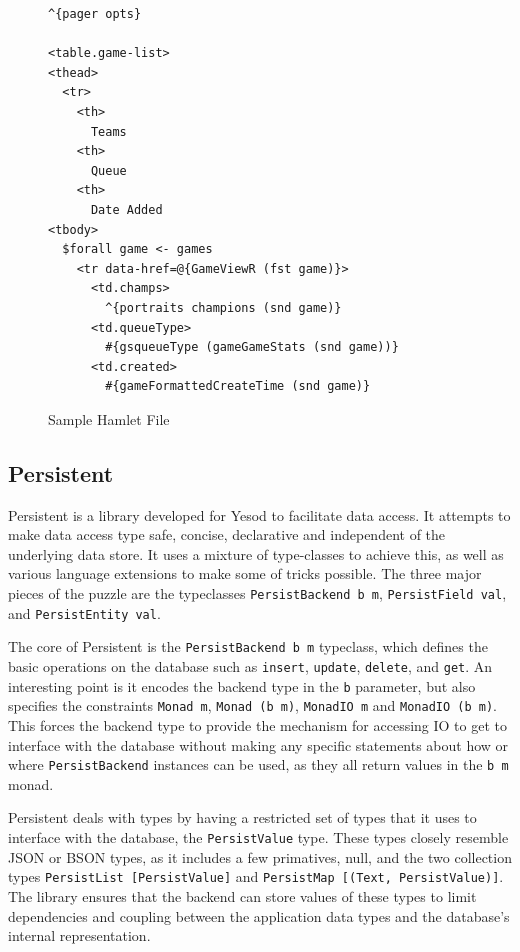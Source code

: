 \documentclass{chi2009}
\newcommand{\code}[1]{\texttt{#1}}
\begin{document}
\begin{figure}[]
\begin{verbatim}
^{pager opts}

<table.game-list>
<thead>
  <tr>
    <th>
      Teams
    <th>
      Queue
    <th>
      Date Added
<tbody>
  $forall game <- games
    <tr data-href=@{GameViewR (fst game)}>
      <td.champs>
        ^{portraits champions (snd game)}
      <td.queueType>
        #{gsqueueType (gameGameStats (snd game))}
      <td.created>
        #{gameFormattedCreateTime (snd game)}
\end{verbatim}
    \caption{Sample Hamlet File}
    \label{hamlet}
\end{figure}

\subsection{Persistent}

Persistent is a library developed for Yesod to facilitate data access.  It attempts to make data access type safe, concise, declarative and independent of the underlying data store.  It uses a mixture of type-classes to achieve this, as well as various language extensions to make some of tricks possible.  The three major pieces of the puzzle are the typeclasses \code{PersistBackend b m}, \code{PersistField val}, and \code{PersistEntity val}.

The core of Persistent is the \code{PersistBackend b m} typeclass, which defines the basic operations on the database such as \code{insert}, \code{update}, \code{delete}, and \code{get}.  An interesting point is it encodes the backend type in the \code{b} parameter, but also specifies the constraints \code{Monad m}, \code{Monad (b m)}, \code{MonadIO m} and \code{MonadIO (b m)}.  This forces the backend type to provide the mechanism for accessing IO to get to interface with the database without making any specific statements about how or where \code{PersistBackend} instances can be used, as they all return values in the \code{b m} monad.

Persistent deals with types by having a restricted set of types that it uses to interface with the database, the \code{PersistValue} type.  These types closely resemble JSON or BSON types, as it includes a few primatives, null, and the two collection types \code{PersistList [PersistValue]} and \code{PersistMap [(Text, PersistValue)]}.  The library ensures that the backend can store values of these types to limit dependencies and coupling between the application data types and the database's internal representation.
\end{document}
